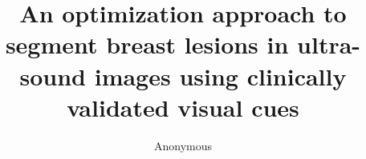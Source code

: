 
\title{ An optimization approach to segment breast lesions in ultra-sound images using clinically validated visual cues }


\author{
  Anonymous
}


